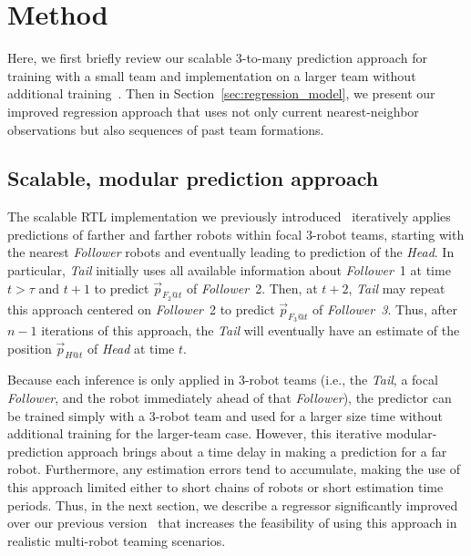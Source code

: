 \documentclass[letterpaper, 10 pt, conference]{ieeeconf}  %
\begin{document}

	\section{Method}
	\label{sec:method}

    Here, we first briefly review our scalable 3-to-many prediction
    approach for training with a small team and implementation on a
    larger team without additional training~\cite{CPR17}. Then in
    Section~\ref{sec:regression_model}, we present our improved
    regression approach that uses not only current nearest-neighbor
    observations but also sequences of past team formations.

    \subsection{Scalable, modular prediction approach}
	\label{sec:scalable_prediction}

    The scalable RTL implementation we previously
    introduced~\cite{CPR17} iteratively applies predictions of farther
    and farther robots within focal 3-robot teams, starting with the
    nearest \emph{Follower} robots and eventually leading to prediction
    of the \emph{Head}. In particular, \emph{Tail} initially uses all
    available information about \emph{Follower}~1 at time $t > \tau$ and
    $t+1$ to predict $\vec{p}_{F_2@t}$ of \emph{Follower}~2. Then,
    at $t+2$, \emph{Tail} may repeat this approach centered on
    \emph{Follower}~2 to predict $\vec{p}_{F_3@t}$ of
    \emph{Follower~3}. Thus, after $n-1$ iterations of this approach,
    the \emph{Tail} will eventually have an estimate of the position
    $\vec{p}_{H@t}$ of \emph{Head} at time $t$.

    Because each inference is only applied in 3-robot teams (i.e.,
    the \emph{Tail}, a focal \emph{Follower}, and the robot
    immediately ahead of that \emph{Follower}), the predictor can be
    trained simply with a $3$-robot team and used for a larger size time
    without additional training for the larger-team case.
    However, this iterative modular-prediction approach brings about a
    time delay in making a prediction for a far robot. Furthermore, any
    estimation errors tend to accumulate, making the use of this
    approach limited either to short chains of robots or short
    estimation time periods. Thus, in the next section, we describe a
    regressor significantly improved over our previous
    version~\cite{CPR17} that increases the feasibility of using this
    approach in realistic multi-robot teaming scenarios.
\end{document}
